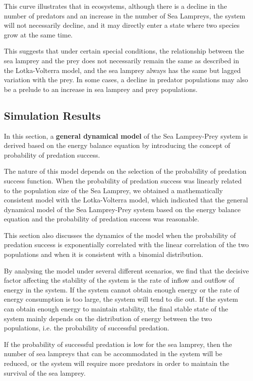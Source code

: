 \documentclass{mcmthesis}
\begin{document}
This curve illustrates that in ecosystems, although there is a decline in the number of predators and an increase in the number of Sea Lampreys,
the system will not necessarily decline, and it may directly enter a state where two species grow at the same time.

This suggests that under certain special conditions, the relationship between the sea lamprey
and the prey does not necessarily remain the same as described in the Lotka-Volterra model,
and the sea lamprey always has the same but lagged variation with the prey.
In some cases, a decline in predator populations may also be a prelude to an increase in sea lamprey and prey populations.

\subsection{Simulation Results}

In this section, a \textbf{general dynamical model} of the Sea Lamprey-Prey system is derived based on the energy balance equation
by introducing the concept of probability of predation success.

The nature of this model depends on the selection of the probability of predation success function.
When the probability of predation success was linearly related to the population size of the Sea Lamprey,
we obtained a mathematically consistent model with the Lotka-Volterra model,
which indicated that the general dynamical model of the Sea Lamprey-Prey system based on the energy balance equation and the probability of predation success was reasonable.

This section also discusses the dynamics of the model when the probability of predation success is exponentially correlated
with the linear correlation of the two populations and when it is consistent with a binomial distribution.

By analysing the model under several different scenarios, we find that the decisive factor affecting
the stability of the system is the rate of inflow and outflow of energy in the system.
If the system cannot obtain enough energy or the rate of energy consumption is too large,
the system will tend to die out. If the system can obtain enough energy to maintain stability,
the final stable state of the system mainly depends on the distribution of energy between the two populations, i.e.
the probability of successful predation.

If the probability of successful predation is low for the sea lamprey,
then the number of sea lampreys that can be accommodated in the system will be reduced,
or the system will require more predators in order to maintain the survival of the sea lamprey.
\end{document}

